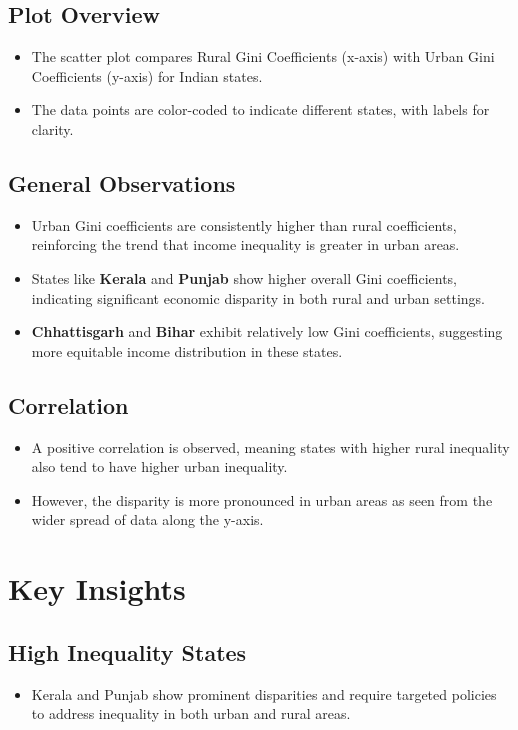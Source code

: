\documentclass{article}
\begin{document}
	\subsection*{Plot Overview}
	\begin{itemize}
		\item The scatter plot compares Rural Gini Coefficients (x-axis) with Urban Gini Coefficients (y-axis) for Indian states.
		\item The data points are color-coded to indicate different states, with labels for clarity.
	\end{itemize}
	
	\subsection*{General Observations}
	\begin{itemize}
		\item Urban Gini coefficients are consistently higher than rural coefficients, reinforcing the trend that income inequality is greater in urban areas.
		\item States like \textbf{Kerala} and \textbf{Punjab} show higher overall Gini coefficients, indicating significant economic disparity in both rural and urban settings.
		\item \textbf{Chhattisgarh} and \textbf{Bihar} exhibit relatively low Gini coefficients, suggesting more equitable income distribution in these states.
	\end{itemize}
	
	\subsection*{Correlation}
	\begin{itemize}
		\item A positive correlation is observed, meaning states with higher rural inequality also tend to have higher urban inequality.
		\item However, the disparity is more pronounced in urban areas as seen from the wider spread of data along the y-axis.
	\end{itemize}
	
	\section*{Key Insights}
	
	\subsection*{High Inequality States}
	\begin{itemize}
		\item Kerala and Punjab show prominent disparities and require targeted policies to address inequality in both urban and rural areas.
	\end{itemize}
	
\end{document}
